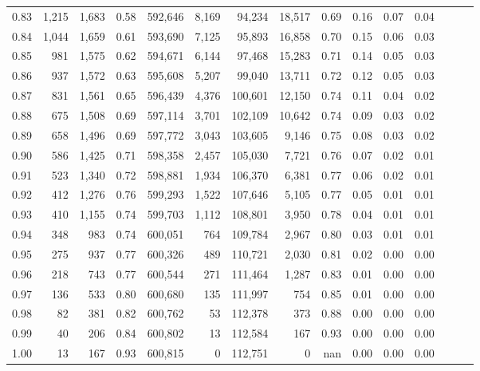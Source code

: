 \begin{tabular}{rrrrrrrrrrrrrrr}
0.83 &   1,215 &  1,683 &  0.58 &  592,646 &    8,169 &   94,234 &   18,517 &  0.69 &  0.16 &  0.07 &      0.04 \\
0.84 &   1,044 &  1,659 &  0.61 &  593,690 &    7,125 &   95,893 &   16,858 &  0.70 &  0.15 &  0.06 &      0.03 \\
0.85 &     981 &  1,575 &  0.62 &  594,671 &    6,144 &   97,468 &   15,283 &  0.71 &  0.14 &  0.05 &      0.03 \\
0.86 &     937 &  1,572 &  0.63 &  595,608 &    5,207 &   99,040 &   13,711 &  0.72 &  0.12 &  0.05 &      0.03 \\
0.87 &     831 &  1,561 &  0.65 &  596,439 &    4,376 &  100,601 &   12,150 &  0.74 &  0.11 &  0.04 &      0.02 \\
0.88 &     675 &  1,508 &  0.69 &  597,114 &    3,701 &  102,109 &   10,642 &  0.74 &  0.09 &  0.03 &      0.02 \\
0.89 &     658 &  1,496 &  0.69 &  597,772 &    3,043 &  103,605 &    9,146 &  0.75 &  0.08 &  0.03 &      0.02 \\
0.90 &     586 &  1,425 &  0.71 &  598,358 &    2,457 &  105,030 &    7,721 &  0.76 &  0.07 &  0.02 &      0.01 \\
0.91 &     523 &  1,340 &  0.72 &  598,881 &    1,934 &  106,370 &    6,381 &  0.77 &  0.06 &  0.02 &      0.01 \\
0.92 &     412 &  1,276 &  0.76 &  599,293 &    1,522 &  107,646 &    5,105 &  0.77 &  0.05 &  0.01 &      0.01 \\
0.93 &     410 &  1,155 &  0.74 &  599,703 &    1,112 &  108,801 &    3,950 &  0.78 &  0.04 &  0.01 &      0.01 \\
0.94 &     348 &    983 &  0.74 &  600,051 &      764 &  109,784 &    2,967 &  0.80 &  0.03 &  0.01 &      0.01 \\
0.95 &     275 &    937 &  0.77 &  600,326 &      489 &  110,721 &    2,030 &  0.81 &  0.02 &  0.00 &      0.00 \\
0.96 &     218 &    743 &  0.77 &  600,544 &      271 &  111,464 &    1,287 &  0.83 &  0.01 &  0.00 &      0.00 \\
0.97 &     136 &    533 &  0.80 &  600,680 &      135 &  111,997 &      754 &  0.85 &  0.01 &  0.00 &      0.00 \\
0.98 &      82 &    381 &  0.82 &  600,762 &       53 &  112,378 &      373 &  0.88 &  0.00 &  0.00 &      0.00 \\
0.99 &      40 &    206 &  0.84 &  600,802 &       13 &  112,584 &      167 &  0.93 &  0.00 &  0.00 &      0.00 \\
1.00 &      13 &    167 &  0.93 &  600,815 &        0 &  112,751 &        0 &   nan &  0.00 &  0.00 &      0.00 \\
\bottomrule
\end{tabular}
